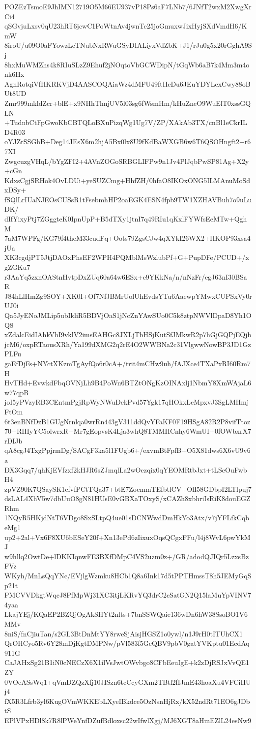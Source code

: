 POZEzTsmoE9JhIMN12719O5M66EU937vP18Ps6aF7LNb7/6JNfT2wxM2XwgXrCi4
qSGvjuLxsv0qU23hRT6jcwC1PoWtnAv4jwnTe25joGmuxwJixHyjSXdVmdH6/KmW
8iroU/u09O0aFYowzLcTNubNxRWuGSyDIALiyxVdZbK+J1/rJu0g5x20rGghA9Sj
8hxMuWMZhs4k8RIuSLzZ9Ehuf2jNOqtoVbGCWDipN/tGqWb6aB7k4Mm3m4onk6Hx
AgnRotqiVfHKRKVjD4AASCOQAiaWz4dMFU49ftHcDu6JEuYDYLexCwy88oBUt8UD
Zmr999mkldZcr+blE+x9NHhThnjUV5l03sg6fWsmHm/kHuZneO9WuElT0xssGQLN
+TudnbCtFpGwoKbCBTQLoBXuPizqWg1Ug7V/ZP/XAkAb3TX/cnBl1eCkrILD4R03
oYJZrSSGhB+Deg14JEsX6m2hjA5Bx0lx8U9fKdBaWXGB6w6T6QSOHngft2+r67XI
ZwgcuzgVHqL/bYgZFI2+4AVnZOGoSRBGLIFPw9n1Jv4PlJqbPwSP81Ag+X2y+cGn
KdxsCgjSRHok4OvLDUi+yeSUZCmg+HhfZH/0hfaO8IKOxONG5ILMAnuMoSdxDSy+
fSQlLrIUaNJEOsCUSsR1tFsebmhHP2oaEGK4ESN4fpb9TW1XZHAVBuh7o9uLuDK/
dIfYixyPtj7ZGggteK0IpnUpP+B5dTXy1jtnI7q49RIu1qKxlFYWfsEeMTw+QghM
7aM7WPFg/KG79f4theM33cudFq+Oots79ZgsCJw4qXYkI26WX2+HKOP93xsa4jUa
XK3cgdjPT5JtjDAOxPhsEF2WPH4PQMblMsWzlubPf+G+PupDFe/PCUD+/xgZGKu7
r3AaYq5zxnOAStnHvtpDxZUq60a64w6ESx+e9YKkNa/n/nNzFr/egJ63nI30BSaR
J84hLlHmZg9SOY+XK0I+Of7NfJBMrUolUhEvdsYTu6AaewpYMwxCUPSxVy0rUJ0i
Qa5JyENoJMLip5ubIkliR5BDVjOaS1jNcZnYAwSUo0C5k8ztpNWVlDpaD8Yh1OQ8
xZdalcEidIAhkVhI9vklV2imsEAHGc8JXLjTbHSjKutSfJMkwR2p7hGjGQPjEQjb
jcM6/oxpRTaousXRh/Ya199dXMG2q2rE4O2WWBNa2c31VlgwwNowBP3JD1GzPLFu
gaEfDjFs+NYctXKzmTgAyfQo6r0cA+/trit4mCHw9uh/fAJXce4TXaPxRI60Rm7H
HvTHd+EvwkdFbqOVNjLh9B4PoWn6BTZtONgKzOINAxlj1NbmY8XmWAjaL6w77qpB
joI5yPVzyRB3CEntmPgjRpWyNWuDekPvd57Ygk17qHOkxLcMpxvJ3SgLMHmjFtOm
6t3enBNfDzB1GUgNrnlqa0wrRn443gV311ddQvYFaKF0F19HSgA82R2P8vifTtoz
70+RIHyYC5olwrxR+Mr7gEopvsK4Lja3whQ8TMMHCnhy6WmUI+0fOWbxrX7rDIJb
qA8cgJ4TxgPpjrmDg/SACgF3ka5l1FUgb6+/exvmBtFpfB+O5X81dws6X6vU9v6a
DX3Gqq7/qhKjEVfzxf2kHJR6sZJmqlLa2wOezqix0qYEOMRtbJxt+tLSeOuFwbH4
zpVZ90K7QSaySK1cfvfPCtTQa37+btE7ZoemmTEfbtlCV+OlI58GDbpI2LTlpuj7
dsLAL4XhV5w7dbUuO8gN81HUsE0vGBXaTOxyS/xCAZh8xbhriIsRiK8douEGZRhm
1NQyR5HKjdNtT6VDgo8SxSLtpQ4ue01sDCNWwdDmHkYo3Atx/v7jYFLfkCqbeMg1
up2+2al+Vx6F8XU6bESeY20f+Xn13ePd6zIixuxOqsQCgxFFu/l4j8WvL6pwYkMJ
w9hllq2OwtDe+lDKKIqnwFE3BXfDMpC4VS2uzm0z+/GR/adodQJIQr5LzxsBzFVz
WKyh/MnLsQqYNc/EVjlgWzmku8HCb1Q8a6Ink17d5tPPTHmssT8h5JEMyGqSp21t
PMCVVDkgtWqcJ8PfMpWj31XC3itjLKRvYQ3drC2cSatGN2Q15laMuYpVINV74yaa
LkajYEj/KQaEP2BZQjOgAkSHYt2nlts+7bnSSWQaie136wDn6hW38SsoBO1V6MMv
8niS/fnCjiuTan/s2GL3BtDnMtYY8rweSjAisjHGSZ1o0ywl/n1J9rH0tITUhCX1
QrOHCyo5Rv6Y28mDjKgtDMPNw/pVl583f5GcQBV9pbV0gatYVKptu01EcdAq911G
CaJAHxSg21B1iN0cNECzX6X1ilVsJwtOWvbgo8CFbEeuIgE+k2zDjRSJxVvQE1ZY
0VOeASsWq1+qVmDZQzXfj10JISzn6tcCcyGXm2TBtl2fIJmE43hoaXu4VFCiHUj4
fX5R3Lfrb3yl6KugOVmWKKEbLXyeIBkdce5OzNsnHjRx/kX52ndRt71EO6gJDbtS
EPlVPxHDl8k7R8lPWeYnfDZufBdloxsc22wIfwlXgj/MJ6XGT8aHmEZlL24esNw9
